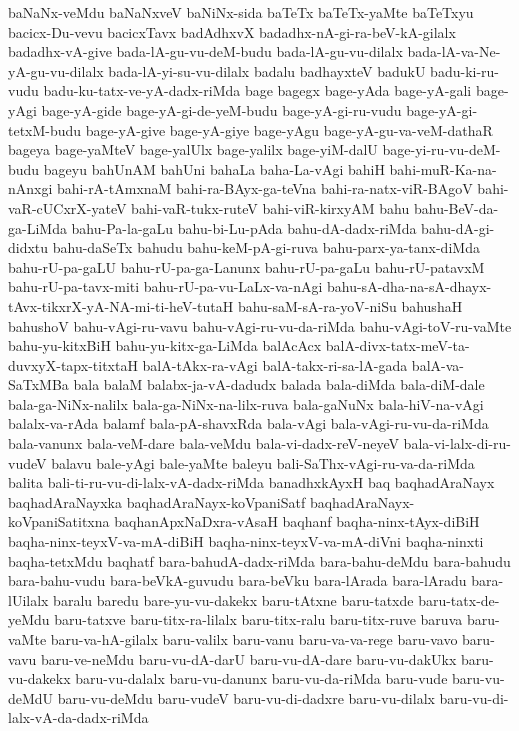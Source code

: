 {baNaNx-veMdu
baNaNxveV
baNiNx-sida
baTeTx
baTeTx-yaMte
baTeTxyu
bacicx-Du-vevu
bacicxTavx
badAdhxvX
badadhx-nA-gi-ra-beV-kA-gilalx
badadhx-vA-give
bada-lA-gu-vu-deM-budu
bada-lA-gu-vu-dilalx
bada-lA-va-Ne-yA-gu-vu-dilalx
bada-lA-yi-su-vu-dilalx
badalu
badhayxteV
badukU
badu-ki-ru-vudu
badu-ku-tatx-ve-yA-dadx-riMda
bage
bagegx
bage-yAda
bage-yA-gali
bage-yAgi
bage-yA-gide
bage-yA-gi-de-yeM-budu
bage-yA-gi-ru-vudu
bage-yA-gi-tetxM-budu
bage-yA-give
bage-yA-giye
bage-yAgu
bage-yA-gu-va-veM-dathaR
bageya
bage-yaMteV
bage-yalUlx
bage-yalilx
bage-yiM-dalU
bage-yi-ru-vu-deM-budu
bageyu
bahUnAM
bahUni
bahaLa
baha-La-vAgi
bahiH
bahi-muR-Ka-na-nAnxgi
bahi-rA-tAmxnaM
bahi-ra-BAyx-ga-teVna
bahi-ra-natx-viR-BAgoV
bahi-vaR-cUCxrX-yateV
bahi-vaR-tukx-ruteV
bahi-viR-kirxyAM
bahu
bahu-BeV-da-ga-LiMda
bahu-Pa-la-gaLu
bahu-bi-Lu-pAda
bahu-dA-dadx-riMda
bahu-dA-gi-didxtu
bahu-daSeTx
bahudu
bahu-keM-pA-gi-ruva
bahu-parx-ya-tanx-diMda
bahu-rU-pa-gaLU
bahu-rU-pa-ga-Lanunx
bahu-rU-pa-gaLu
bahu-rU-patavxM
bahu-rU-pa-tavx-miti
bahu-rU-pa-vu-LaLx-va-nAgi
bahu-sA-dha-na-sA-dhayx-tAvx-tikxrX-yA-NA-mi-ti-heV-tutaH
bahu-saM-sA-ra-yoV-niSu
bahushaH
bahushoV
bahu-vAgi-ru-vavu
bahu-vAgi-ru-vu-da-riMda
bahu-vAgi-toV-ru-vaMte
bahu-yu-kitxBiH
bahu-yu-kitx-ga-LiMda
balAcAcx
balA-divx-tatx-meV-ta-duvxyX-tapx-titxtaH
balA-tAkx-ra-vAgi
balA-takx-ri-sa-lA-gada
balA-va-SaTxMBa
bala
balaM
balabx-ja-vA-dadudx
balada
bala-diMda
bala-diM-dale
bala-ga-NiNx-nalilx
bala-ga-NiNx-na-lilx-ruva
bala-gaNuNx
bala-hiV-na-vAgi
balalx-va-rAda
balamf
bala-pA-shavxRda
bala-vAgi
bala-vAgi-ru-vu-da-riMda
bala-vanunx
bala-veM-dare
bala-veMdu
bala-vi-dadx-reV-neyeV
bala-vi-lalx-di-ru-vudeV
balavu
bale-yAgi
bale-yaMte
baleyu
bali-SaThx-vAgi-ru-va-da-riMda
balita
bali-ti-ru-vu-di-lalx-vA-dadx-riMda
banadhxkAyxH
baq
baqhadAraNayx
baqhadAraNayxka
baqhadAraNayx-koVpaniSatf
baqhadAraNayx-koVpaniSatitxna
baqhanApxNaDxra-vAsaH
baqhanf
baqha-ninx-tAyx-diBiH
baqha-ninx-teyxV-va-mA-diBiH
baqha-ninx-teyxV-va-mA-diVni
baqha-ninxti
baqha-tetxMdu
baqhatf
bara-bahudA-dadx-riMda
bara-bahu-deMdu
bara-bahudu
bara-bahu-vudu
bara-beVkA-guvudu
bara-beVku
bara-lArada
bara-lAradu
bara-lUilalx
baralu
baredu
bare-yu-vu-dakekx
baru-tAtxne
baru-tatxde
baru-tatx-de-yeMdu
baru-tatxve
baru-titx-ra-lilalx
baru-titx-ralu
baru-titx-ruve
baruva
baru-vaMte
baru-va-hA-gilalx
baru-valilx
baru-vanu
baru-va-va-rege
baru-vavo
baru-vavu
baru-ve-neMdu
baru-vu-dA-darU
baru-vu-dA-dare
baru-vu-dakUkx
baru-vu-dakekx
baru-vu-dalalx
baru-vu-danunx
baru-vu-da-riMda
baru-vude
baru-vu-deMdU
baru-vu-deMdu
baru-vudeV
baru-vu-di-dadxre
baru-vu-dilalx
baru-vu-di-lalx-vA-da-dadx-riMda
}
